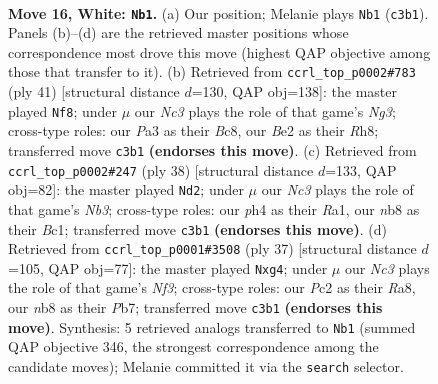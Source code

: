 \documentclass[11pt]{article}
\begin{document}
\clearpage

\begin{figure}[p]\centering
\begin{subfigure}{0.46\textwidth}\centering
\resizebox{\linewidth}{!}{%
\newchessgame
\chessboard[
  setfen={rnbr1k2/5pb1/2p2np1/1p2N3/p3PB1p/P1N5/RPP1BPPP/4RK2 w - - 0 16},
  showmover=false,
  pgfstyle=straightmove, color=movearrow, markmove={c3-b1}
]}
\caption{}
\end{subfigure}\hfill
\begin{subfigure}{0.46\textwidth}\centering
\resizebox{\linewidth}{!}{%
\newchessgame
\chessboard[
  setfen={2b1k2r/1pp1b1p1/2p3n1/r3Pp1p/p2N1P2/P1N1B1PP/1PPR4/4R1K1 b - - 0 21},
  showmover=false,
  pgfstyle=straightmove, color=movearrow, markmove={g6-f8}
]}
\caption{}
\end{subfigure}
\\[4pt]
\begin{subfigure}{0.46\textwidth}\centering
\resizebox{\linewidth}{!}{%
\newchessgame
\chessboard[
  setfen={r3kb1r/1b5p/1p2n1p1/p1p1Pp2/P2p1P2/1NPP4/1P4PP/R1B1NRK1 w kq - 1 20},
  showmover=false,
  pgfstyle=straightmove, color=movearrow, markmove={b3-d2}
]}
\caption{}
\end{subfigure}\hfill
\begin{subfigure}{0.46\textwidth}\centering
\resizebox{\linewidth}{!}{%
\newchessgame
\chessboard[
  setfen={r3r1k1/1pp2pb1/2n1bn1p/p3p3/1P2P1P1/P1P1BNN1/2B2PP1/R2R2K1 b - - 0 19},
  showmover=false,
  pgfstyle=straightmove, color=movearrow, markmove={f6-g4}
]}
\caption{}
\end{subfigure}
\caption{\textbf{Move 16, White: \texttt{Nb1}.} (a) Our position; Melanie plays \texttt{Nb1} (\texttt{c3b1}). Panels (b)--(d) are the retrieved master positions whose correspondence most drove this move (highest QAP objective among those that transfer to it). (b) Retrieved from \texttt{ccrl\_top\_p0002\#783} (ply 41) [structural distance $d$=130, QAP obj=138]: the master played \texttt{Nf8}; under $\mu$ our \emph{Nc3} plays the role of that game's \emph{Ng3}; cross-type roles: our \emph{P}a3 as their \emph{B}c8, our \emph{B}e2 as their \emph{R}h8; transferred move \texttt{c3b1} \textbf{(endorses this move)}. (c) Retrieved from \texttt{ccrl\_top\_p0002\#247} (ply 38) [structural distance $d$=133, QAP obj=82]: the master played \texttt{Nd2}; under $\mu$ our \emph{Nc3} plays the role of that game's \emph{Nb3}; cross-type roles: our \emph{p}h4 as their \emph{R}a1, our \emph{n}b8 as their \emph{B}c1; transferred move \texttt{c3b1} \textbf{(endorses this move)}. (d) Retrieved from \texttt{ccrl\_top\_p0001\#3508} (ply 37) [structural distance $d$=105, QAP obj=77]: the master played \texttt{Nxg4}; under $\mu$ our \emph{Nc3} plays the role of that game's \emph{Nf3}; cross-type roles: our \emph{P}c2 as their \emph{R}a8, our \emph{n}b8 as their \emph{P}b7; transferred move \texttt{c3b1} \textbf{(endorses this move)}. Synthesis: 5 retrieved analogs transferred to \texttt{Nb1} (summed QAP objective 346, the strongest correspondence among the candidate moves); Melanie committed it via the \texttt{search} selector.}
\label{fig:thought-m30}
\end{figure}
\end{document}
